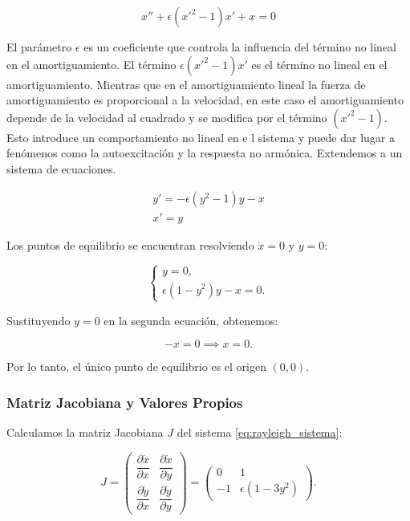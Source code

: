 \documentclass[12pt, a4paper]{report}
\begin{document}
$$x''+\epsilon(x'^2-1)x'+x=0$$

El parámetro $\epsilon$ es un coeficiente que controla la influencia del término no lineal en el amortiguamiento.
El término $\epsilon(x'^2 - 1)x'$ es el término no lineal en el amortiguamiento. Mientras que en el amortiguamiento
lineal la fuerza de amortiguamiento es proporcional a la velocidad, en este caso el amortiguamiento depende de
la velocidad al cuadrado y se modifica por el término $(x'^2 - 1)$. Esto introduce un comportamiento no lineal en e
l sistema y puede dar lugar a fenómenos como la autoexcitación y la respuesta no armónica.
Extendemos a un sistema de ecuaciones.

\begin{equation}\label{eq: Rayleigh}
	\begin{matrix}
		y'=-\epsilon(y^2-1)y-x \\
		x'=y
	\end{matrix}
\end{equation}


Los puntos de equilibrio se encuentran resolviendo \(\dot{x} = 0\) y \(\dot{y} = 0\):

\begin{equation}
    \begin{cases}
        y = 0, \\
        \epsilon \left(1 - y^2\right) y - x = 0.
    \end{cases}
\end{equation}

Sustituyendo \( y = 0 \) en la segunda ecuación, obtenemos:

\begin{equation}
    - x = 0 \implies x = 0.
\end{equation}

Por lo tanto, el único punto de equilibrio es el origen \((0, 0)\).

\subsubsection{Matriz Jacobiana y Valores Propios}

Calculamos la matriz Jacobiana \( J \) del sistema \eqref{eq:rayleigh_sistema}:

\begin{equation}
    J =
    \begin{pmatrix}
        \dfrac{\partial \dot{x}}{\partial x} & \dfrac{\partial \dot{x}}{\partial y} \\
        \dfrac{\partial \dot{y}}{\partial x} & \dfrac{\partial \dot{y}}{\partial y}
    \end{pmatrix}
    =
    \begin{pmatrix}
        0 & 1 \\
        -1 & \epsilon \left(1 - 3 y^2\right)
    \end{pmatrix}.
\end{equation}
\end{document}
